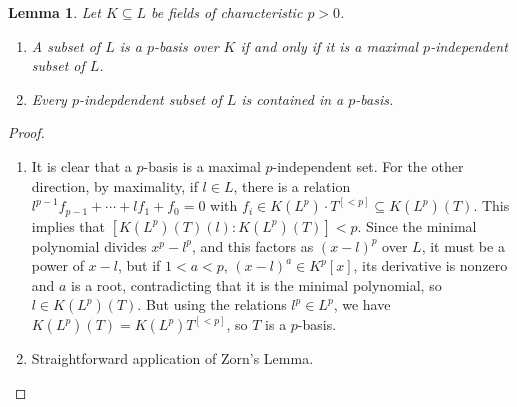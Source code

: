 \documentclass{amsart}[12pt]
\numberwithin{equation}{section}
\theoremstyle{plain} %
\newtheorem{lem}[equation]{Lemma}
\theoremstyle{definition}
\theoremstyle{remark}
\begin{document}
\begin{lem} Let $K\subseteq L$ be fields of characteristic $p>0$.
\begin{enumerate}
\item A subset of $L$ is a $p$-basis over $K$ if and only if it is a maximal $p$-independent subset of $L$.
\item Every $p$-indepdendent subset of $L$ is contained in a $p$-basis.
\end{enumerate}
\end{lem}
\begin{proof}
\begin{enumerate}

\item It is clear that a $p$-basis is a maximal $p$-independent set. For the other direction, by maximality, if $l\in L$, there is a relation $l^{p-1} f_{p-1} + \cdots + l f_1 + f_0 = 0$ with $f_i\in K(L^p)\cdot T^{[<p]} \subseteq K(L^p)(T)$. This implies that $[K(L^p)(T)(l) : K(L^p)(T)] <p$. Since the minimal polynomial divides $x^p-l^p$, and this factors as $(x-l)^p$ over $L$, it must be a power of $x-l$, but if $1<a<p$, $(x-l)^a\in K^p[x]$, its derivative is nonzero and $a$ is a root, contradicting that it is the minimal polynomial, so $l\in K(L^p)(T)$. But using the relations $l^p \in L^p$, we have $K(L^p)(T)=K(L^p) T^{[<p]}$, so $T$ is a $p$-basis.

\item Straightforward application of Zorn's Lemma.\qedhere

\end{enumerate}
\end{proof}
\end{document}

